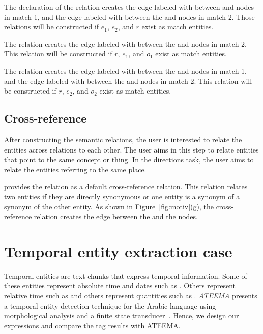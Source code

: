 \begin{appendices}
The declaration of the relation  creates the 
edge labeled with  between  and  nodes in match 1, and the 
edge labeled with  between the  and  nodes in match 2. 
Those relations will be constructed if $e_1$, $e_2$, and $r$ exist as match entities.

The relation  creates 
the edge labeled with  between the  and  nodes in match 2. 
This relation will be constructed if $r$, $e_1$, and $o_1$ exist as match entities.

The relation  creates 
the edge labeled with  between the  and  nodes in match 1, and the 
edge labeled with  between the  and  nodes in match 2. 
This relation will be constructed if $r$, $e_2$, and $o_2$ exist as match entities.

\subsection*{Cross-reference} 

After constructing the semantic relations, the user is interested to relate the entities across relations to each other. 
The user aims in this step to relate entities that point to the same concept or thing. 
In the directions task, the user aims to relate the entities referring to the same place. 

\framework provides the  relation as a default cross-reference relation. 
This relation relates two entities if they are directly synonymous or one entity is a synonym of a synonym of the other entity. 
As shown in Figure~\ref{fig:motiv}(g), the cross-reference relation creates the edge between the  and the  nodes.

\newpage

\section{Temporal entity extraction case}
\label{a:temporal}


Temporal entities are text chunks that express temporal information. 
Some of these entities represent absolute time and dates such as . 
Others represent relative time such as  and others represent quantities 
such as . 
{\em ATEEMA} presents a temporal entity detection technique for the Arabic language using 
morphological analysis and a finite state transducer~\cite{ZaMa2012IJCLATime}. 
Hence, we design our expressions and compare the tag results with ATEEMA.


\end{appendices}
